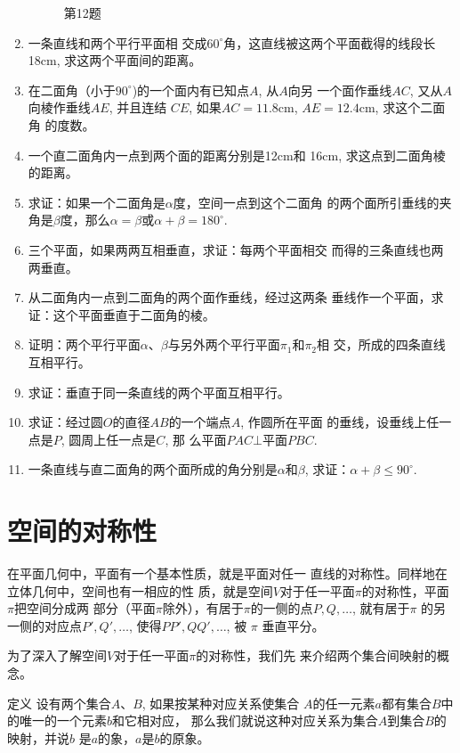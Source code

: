 \begin{enumerate}
\begin{figure}[htp]
\begin{tikzpicture}
\end{tikzpicture}
  \caption*{第12题}
\end{figure}

\item 一条直线和两个平行平面相
交成$60^{\circ}$角，这直线被这两个平面截得的线段长18cm, 
求这两个平面间的距离。
\item 在二面角（小于$90^{\circ}$)的一个面内有已知点$A$, 从$A$向另
一个面作垂线$AC$, 又从$A$向棱作垂线$AE$, 并且连结
$CE$, 如果$AC=11.8$cm, $AE=12.4$cm, 求这个二面角
的度数。
\item 一个直二面角内一点到两个面的距离分别是12cm和
16cm, 求这点到二面角棱的距离。
\item 求证：如果一个二面角是$\alpha$度，空间一点到这个二面角
的两个面所引垂线的夹角是$\beta$度，那么$\alpha=\beta$或$\alpha+\beta=180^{\circ}$.
\item 三个平面，如果两两互相垂直，求证：每两个平面相交
而得的三条直线也两两垂直。
\item 从二面角内一点到二面角的两个面作垂线，经过这两条
垂线作一个平面，求证：这个平面垂直于二面角的棱。
\item 证明：两个平行平面$\alpha$、$\beta$与另外两个平行平面$\pi_1$和$\pi_2$相
交，所成的四条直线互相平行。
\item 求证：垂直于同一条直线的两个平面互相平行。
\item 求证：经过圆$O$的直径$AB$的一个端点$A$, 作圆所在平面
的垂线，设垂线上任一点是$P$, 圆周上任一点是$C$, 那
么平面$PAC\bot $平面$PBC$.
\item 一条直线与直二面角的两个面所成的角分别是$\alpha$和$\beta$, 
求证：$\alpha+\beta\le 90^{\circ}$.
\end{enumerate}

\section{空间的对称性}
在平面几何中，平面有一个基本性质，就是平面对任一
直线的对称性。同样地在立体几何中，空间也有一相应的性
质，就是空间$V$对于任一平面$\pi$的对称性，平面$\pi$把空间分成两
部分（平面$\pi$除外），有居于$\pi$的一侧的点$P,Q,\ldots$, 就有居于$\pi$
的另一侧的对应点$P',Q',\ldots$, 使得$PP',QQ',\ldots$, 被
$\pi$
垂直平分。

为了深入了解空间$V$对于任一平面$\pi$的对称性，我们先
来介绍两个集合间映射的概念。

\begin{blk}
 {定义} 设有两个集合$A$、$B$, 如果按某种对应关系使集合
$A$的任一元素$a$都有集合$B$中的唯一的一个元素$b$和它相对应，
那么我们就说这种对应关系为集合$A$到集合$B$的映射，并说$b$
是$a$的象，$a$是$b$的原象。 
\end{blk}

